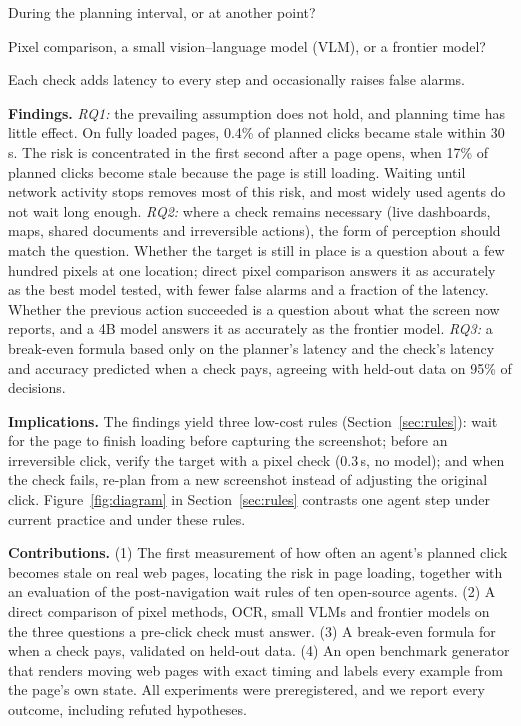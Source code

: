 \documentclass[10pt]{article}
\begin{document}
\begin{description}[leftmargin=1.2em,itemsep=1pt,topsep=2pt,font=\normalfont\bfseries]
\item[RQ1. When does the screenshot become stale?] During the planning interval, or at another point?
\item[RQ2. Which form of perception should verify the screen?] Pixel comparison, a small vision--language model (VLM), or a frontier model?
\item[RQ3. When is a check worth its cost?] Each check adds latency to every step and occasionally raises false alarms.
\end{description}

\textbf{Findings.} \emph{RQ1:} the prevailing assumption does not hold, and planning time has little effect. On fully loaded pages, 0.4\% of planned clicks became stale within 30\,s. The risk is concentrated in the first second after a page opens, when 17\% of planned clicks become stale because the page is still loading. Waiting until network activity stops removes most of this risk, and most widely used agents do not wait long enough. \emph{RQ2:} where a check remains necessary (live dashboards, maps, shared documents and irreversible actions), the form of perception should match the question. Whether the target is still in place is a question about a few hundred pixels at one location; direct pixel comparison answers it as accurately as the best model tested, with fewer false alarms and a fraction of the latency. Whether the previous action succeeded is a question about what the screen now reports, and a 4B model answers it as accurately as the frontier model. \emph{RQ3:} a break-even formula based only on the planner's latency and the check's latency and accuracy predicted when a check pays, agreeing with held-out data on 95\% of decisions.

\textbf{Implications.} The findings yield three low-cost rules (Section~\ref{sec:rules}): wait for the page to finish loading before capturing the screenshot; before an irreversible click, verify the target with a pixel check (0.3\,s, no model); and when the check fails, re-plan from a new screenshot instead of adjusting the original click. Figure~\ref{fig:diagram} in Section~\ref{sec:rules} contrasts one agent step under current practice and under these rules.

\textbf{Contributions.} (1) The first measurement of how often an agent's planned click becomes stale on real web pages, locating the risk in page loading, together with an evaluation of the post-navigation wait rules of ten open-source agents. (2) A direct comparison of pixel methods, OCR, small VLMs and frontier models on the three questions a pre-click check must answer. (3) A break-even formula for when a check pays, validated on held-out data. (4) An open benchmark generator that renders moving web pages with exact timing and labels every example from the page's own state. All experiments were preregistered, and we report every outcome, including refuted hypotheses.
\end{document}
